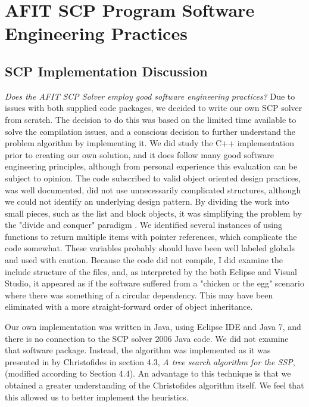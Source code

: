 \documentclass[12pt]{article}
\begin{document}
\section{AFIT SCP Program Software Engineering Practices} \label{scn:design}

\subsection{SCP Implementation Discussion}
\textit{Does the AFIT SCP Solver employ good software engineering practices?}
Due to issues with both supplied code packages, we decided to write our own SCP solver from scratch. The decision to do this was based on the limited time available to solve the compilation issues, and a conscious decision to further understand the problem algorithm by implementing it. We did study the C++ implementation prior to creating our own solution, and it does follow many good software engineering principles, although from personal experience this evaluation can be subject to opinion. The code subscribed to valid object oriented design practices, was well documented, did not use unnecessarily complicated structures, although we could not identify an underlying design pattern. By dividing the work into small pieces, such as the list and block objects, it was simplifying the problem by the "divide and conquer" paradigm \cite{software}. We identified several instances of using functions to return multiple items with pointer references, which complicate the code somewhat. These variables probably should have been well labeled globals and used with caution. Because the code did not compile, I did examine the include structure of the files, and, as interpreted by the both Eclipse and Visual Studio, it appeared as if the software suffered from a "chicken or the egg" scenario where there was something of a circular dependency. This may have been eliminated with a more straight-forward order of object inheritance.

Our own implementation was written in Java, using Eclipse IDE and Java 7, and there is no connection to the SCP solver 2006 Java code. We did not examine that software package. Instead, the algorithm was implemented as it was presented in by Christofides in section 4.3, \textit{A tree search algorithm for the SSP}, (modified according to Section 4.4). An advantage to this technique is that we obtained a greater understanding of the Christofides algorithm itself. We feel that this allowed us to better implement the heuristics.
\end{document}
